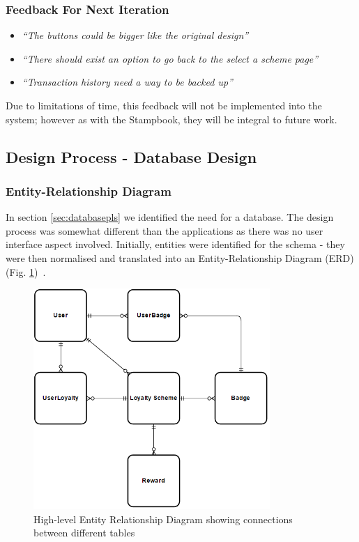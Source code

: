\subsubsection{Feedback For Next Iteration}
\begin{itemize}
  \item \textit{``The buttons could be bigger like the original design''}
  \item \textit{``There should exist an option to go back to the select a scheme page''}
  \item \textit{``Transaction history need a way to be backed up''}
\end{itemize}

Due to limitations of time, this feedback will not be implemented into the system; however as with the Stampbook, they will be integral to future work. 

\newpage
\subsection{Design Process - Database Design}
\subsubsection{Entity-Relationship Diagram}
In section \ref{sec:databasepls} we identified the need for a database.
The design process was somewhat different than the applications as there was no user interface aspect involved. Initially, entities were identified for the schema - they were then normalised and translated into an Entity-Relationship Diagram (ERD)(Fig. \ref{fig:erd})~\cite{erd}.

\begin{figure}[H]
  \centering
    \includegraphics[width=0.8\textwidth]{img/erd.png}
      \caption{High-level Entity Relationship Diagram showing connections between different tables}
      \label{fig:erd}
\end{figure}

